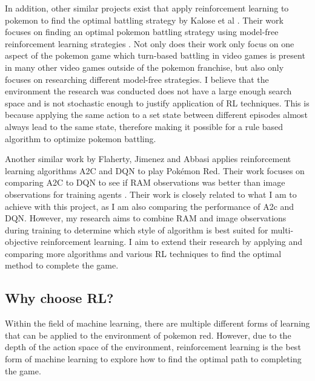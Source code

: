 In addition, other similar projects exist that apply reinforcement learning to pokemon to find the optimal battling strategy by Kalose et al \cite{kalose2018optimal}. Their work focuses on finding an optimal pokemon battling strategy using model-free reinforcement learning strategies \cite{kalose2018optimal}. Not only does their work only focus on one aspect of the pokemon game which turn-based battling in video games is present in many other video games outside of the pokemon franchise, but also only focuses on researching different model-free strategies. I believe that the environment the research was conducted does not have a large enough search space and is not stochastic enough to justify application of RL techniques. This is because applying the same action to a set state between different episodes almost always lead to the same state, therefore making it possible for a rule based algorithm to optimize pokemon battling. 

Another similar work by Flaherty, Jimenez and Abbasi \cite{flaherty2021playing} applies reinforcement learning algorithms A2C and DQN to play Pokémon Red. Their work focuses on comparing A2C to DQN to see if RAM observations was better than image observations for training agents \cite{flaherty2021playing}. Their work is  closely related to what I am to achieve with this project, as I am also comparing the performance of A2c and DQN. However, my research aims to combine RAM and image observations during training to determine which style of algorithm is best suited for multi-objective reinforcement learning. I aim to extend their research by applying and comparing more algorithms and various RL techniques to find the optimal method to complete the game.

\subsection{Why choose RL?}

Within the field of machine learning, there are multiple different forms of learning that can be applied to the environment of pokemon red. However, due to the depth of the action space of the environment, reinforcement learning is the best form of machine learning to explore how to find the optimal path to completing the game. 

